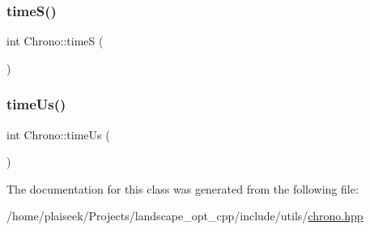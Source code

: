 \mbox{\label{class_chrono_a52c5348d69e89324a3430584cb760651}} 
\subsubsection{\texorpdfstring{time\+S()}{timeS()}}
{\footnotesize\ttfamily int Chrono\+::timeS (\begin{DoxyParamCaption}{ }\end{DoxyParamCaption})\hspace{0.3cm}{\ttfamily [inline]}}

\mbox{\label{class_chrono_ac358f9278ad6089d8fe626b3fe558590}} 
\subsubsection{\texorpdfstring{time\+Us()}{timeUs()}}
{\footnotesize\ttfamily int Chrono\+::time\+Us (\begin{DoxyParamCaption}{ }\end{DoxyParamCaption})\hspace{0.3cm}{\ttfamily [inline]}}



The documentation for this class was generated from the following file\+:\begin{DoxyCompactItemize}
\item 
/home/plaiseek/\+Projects/landscape\+\_\+opt\+\_\+cpp/include/utils/\hyperlink{chrono_8hpp}{chrono.\+hpp}\end{DoxyCompactItemize}
